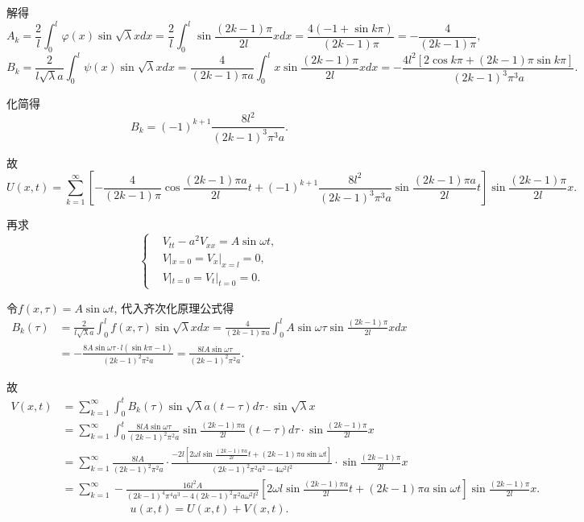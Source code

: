 \documentclass[11pt,a4paper]{article}
\begin{document}
解得
$$A_k=\frac{2}{l}\int_0^l\varphi(x)\sin\sqrt{\lambda}xdx=\frac{2}{l}\int_0^l\sin\frac{(2k-1)\pi}{2l}xdx=\frac{4(-1+\sin k\pi)}{(2k-1)\pi}=-\frac{4}{(2k-1)\pi},$$
$$B_k=\frac{2}{l\sqrt{\lambda}a}\int_0^l\psi(x)\sin\sqrt{\lambda}xdx=
  \frac{4}{(2k-1)\pi a}\int_0^l x\sin\frac{(2k-1)\pi}{2l}xdx=-\frac{4l^2[2\cos k\pi+(2k-1)\pi\sin k\pi]}{(2k-1)^3\pi^3a}.$$

化简得
$$B_k=(-1)^{k+1}\frac{8l^2}{(2k-1)^3\pi^3a}.$$

故
$$U(x,t)=\sum_{k=1}^\infty\left[-\frac{4}{(2k-1)\pi}\cos\frac{(2k-1)\pi a}{2l}t+
    (-1)^{k+1}\frac{8l^2}{(2k-1)^3\pi^3a}\sin\frac{(2k-1)\pi a}{2l}t\right]\sin\frac{(2k-1)\pi}{2l}x.$$

再求
$$
  \left\{\begin{aligned}
     & V_{tt}-a^2V_{xx}=A\sin\omega t, \\
     & V|_{x=0}=V_x|_{x=l}=0,          \\
     & V|_{t=0}=V_t|_{t=0}=0.
  \end{aligned}\right.
$$

令$f(x,\tau)=A\sin\omega t$, 代入齐次化原理公式得
\begin{align*}
  B_k(\tau)
   & =\frac{2}{l\sqrt{\lambda}a}\int_0^lf(x,\tau)\sin\sqrt{\lambda}xdx=\frac{4}{(2k-1)\pi a}\int_0^lA\sin\omega \tau\sin\frac{(2k-1)\pi}{2l}xdx \\
   & =-\frac{8A\sin\omega \tau\cdot l(\sin k\pi -1)}{(2k-1)^2\pi^2a}=\frac{8lA\sin\omega \tau}{(2k-1)^2\pi^2a}.
\end{align*}

故
\begin{align*}
  V(x,t) & =\sum_{k=1}^\infty\int_0^t B_k(\tau)\sin\sqrt{\lambda}a(t-\tau)d\tau\cdot\sin\sqrt{\lambda}x                                                                                            \\
         & =\sum_{k=1}^\infty\int_0^t \frac{8lA\sin\omega \tau}{(2k-1)^2\pi^2a}\sin\frac{(2k-1)\pi a}{2l}(t-\tau)d\tau\cdot\sin\frac{(2k-1)\pi}{2l}x                                               \\
         & =\sum_{k=1}^\infty\frac{8lA}{(2k-1)^2\pi^2a}\cdot\frac{-2l[2\omega l\sin\frac{(2k-1)\pi a}{2l}t+(2k-1)\pi a\sin\omega t]}{(2k-1)^2\pi^2 a^2-4\omega^2l^2}\cdot\sin\frac{(2k-1)\pi}{2l}x \\
         & =\sum_{k=1}^\infty-\frac{16l^2A}{(2k-1)^4\pi^4a^3-4(2k-1)^2\pi^2a\omega^2l^2}\left[2\omega l\sin\frac{(2k-1)\pi a}{2l}t+(2k-1)\pi a\sin\omega t\right]\sin\frac{(2k-1)\pi}{2l}x.
\end{align*}
$$u(x,t)=U(x,t)+V(x,t).$$
\end{document}
